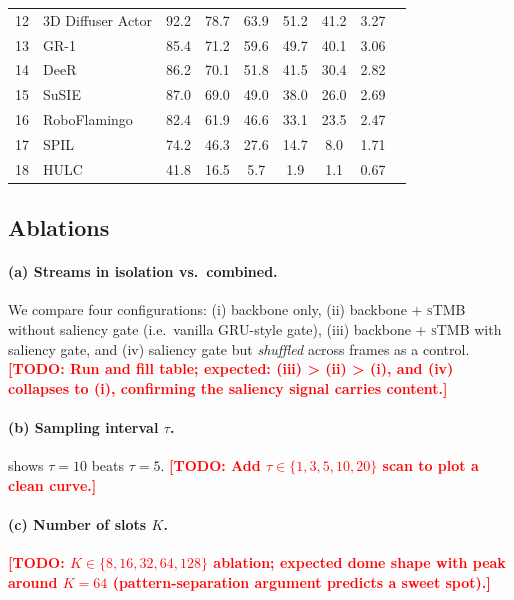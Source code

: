 \documentclass[10pt,letterpaper]{article}
\newcommand{\todo}[1]{\textcolor{red}{\textbf{[TODO: #1]}}}
\newcommand{\sTMB}{\textsc{sTMB}\xspace}
\begin{document}
\begin{table}[t]
\begin{tabular}{rlcccccc c}
12 & 3D Diffuser Actor              & 92.2 & 78.7 & 63.9 & 51.2 & 41.2 & 3.27 \\
13 & GR-1                           & 85.4 & 71.2 & 59.6 & 49.7 & 40.1 & 3.06 \\
14 & DeeR                           & 86.2 & 70.1 & 51.8 & 41.5 & 30.4 & 2.82 \\
15 & SuSIE                          & 87.0 & 69.0 & 49.0 & 38.0 & 26.0 & 2.69 \\
16 & RoboFlamingo                   & 82.4 & 61.9 & 46.6 & 33.1 & 23.5 & 2.47 \\
17 & SPIL                           & 74.2 & 46.3 & 27.6 & 14.7 &  8.0 & 1.71 \\
18 & HULC                           & 41.8 & 16.5 &  5.7 &  1.9 &  1.1 & 0.67 \\
\bottomrule
\end{tabular}
\end{table}

\subsection{Ablations}
\label{sec:exp-ablation}

\paragraph{(a) Streams in isolation vs.\ combined.} We compare four configurations: (i) backbone only, (ii) backbone + \sTMB without saliency gate (i.e.\ vanilla GRU-style gate), (iii) backbone + \sTMB with saliency gate, and (iv) saliency gate but \emph{shuffled} across frames as a control. \todo{Run and fill table; expected: (iii) > (ii) > (i), and (iv) collapses to (i), confirming the saliency signal carries content.}

\paragraph{(b) Sampling interval $\tau$.}  shows $\tau=10$ beats $\tau=5$. \todo{Add $\tau \in \{1, 3, 5, 10, 20\}$ scan to plot a clean curve.}

\paragraph{(c) Number of slots $K$.} \todo{$K \in \{8, 16, 32, 64, 128\}$ ablation; expected dome shape with peak around $K=64$ (pattern-separation argument predicts a sweet spot).}
\end{document}
